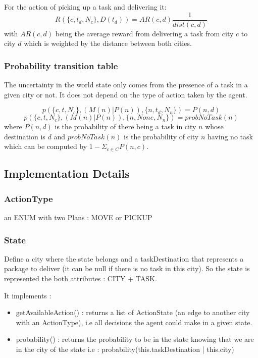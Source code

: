 \documentclass[11pt]{article}
\begin{document}
For the action of picking up a task and delivering it:
$$R(\{c, t_d, N_c\}, D(t_d)) = AR(c, d) \frac{1}{dist(c, d)}$$
with $AR(c, d)$ being the average reward from delivering a task from city
$c$ to city $d$ which is weighted by the distance between both cities.

\subsubsection{Probability transition table}
The uncertainty in the world state only comes from the presence of a task in a
given city or not. It does not depend on the type of action taken by the agent.

$$ p(\{c, t, N_c\}, (M(n)|P(n)), \{n, t_d, N_n\}) = P(n,d)$$
$$ p(\{c, t, N_c\}, (M(n)|P(n)), \{n, None, N_n\}) = probNoTask(n)$$
where $P(n,d)$ is the probability of there being a task in city $n$ whose
destination is $d$ and $probNoTask(n)$ is the probability of city $n$ having no
task which can be computed by $1 - \Sigma_{c \in C} P(n, c)$.

\subsection{Implementation Details}

\subsubsection{ActionType}
an ENUM with two Plans : MOVE or PICKUP

\subsubsection{State}
Define a city where the state belongs and a taskDestination that represents a
package to deliver (it can be null if there is no task in this city). So the
state is represented the both attributes : CITY + TASK.

It implements :
\begin{itemize}
\item getAvailableAction() : returns a list of ActionState (an edge to another
city with an ActionType), i.e all decisions the agent could make in a given
state.
\item probability() : returns the probability to be in the state knowing that we
are in the city of the state i.e : probability(this.taskDestination | this.city)
\end{itemize}
\end{document}
